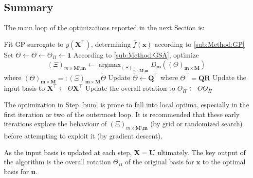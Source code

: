 \documentclass[preprint,12pt]{elsarticle}
\newcommand*{\M}[1]{\ensuremath{#1}\xspace}
\newcommand*{\vr}[1]{\M{\mathbf{#1}}}
\newcommand*{\deqr}{\M{=\mathrel{\mathop:}}}
\DeclareMathOperator*{\argmax}{argmax}
\begin{document}
        \subsection{Summary} \label{sub:Method:Summary}
            The main loop of the optimizations reported in the next Section is:
            \begin{algorithm}
                \begin{algorithmic}[1]
                    \REPEAT
                        \STATE Fit GP surrogate to $y(\vr{X}^{\intercal})$, determining $\bar{f}(\vr{x})$ according to \cref{sub:Method:GP}
                        \STATE Set $\tilde{\Theta} \leftarrow \Theta \leftarrow \Theta_{\Pi} \leftarrow \vr{1}$
                            \STATE According to \cref{sub:Method:GSA}, optimize \label{bum}
                            $$(\Xi)_{m\times\vr{M}\setminus\vr{m}} \leftarrow \argmax_{(\Xi)_{m\times\vr{M}\setminus\vr{m}}} D_{\vr{m}}((\Theta)_{\vr{m}\times\vr{M}})$$
                            where $(\Theta)_{\vr{m}\times\vr{M}} \deqr (\Xi)_{\vr{m}\times\vr{M}} \tilde{\Theta}$
                            \STATE  Update $\tilde{\Theta} \leftarrow \vr{Q}^{\intercal}$ where $\Theta^{\intercal} = \vr{Q}\vr{R}$
                        \ENDFOR
                        \STATE Update the input basis to $\vr{X}^{\intercal} \leftarrow \Theta \vr{X}^{\intercal}$
                        \STATE Update the overall rotation to $\Theta_{\Pi} \leftarrow \Theta \Theta_{\Pi}$
                    \UNTIL{$\Theta \approx \vr{1}$}
                \end{algorithmic}
            \end{algorithm}

            The optimization in Step \ref{bum} is prone to fall into local optima, especially in the first iteration or two of the outermost loop. 
            It is recommended that these early iterations explore the behaviour of \M{(\Xi)_{m\times\vr{M}\setminus\vr{m}}} (by grid or randomized search) before attempting to exploit it (by gradient descent).

            As the input basis is updated at each step, \M{\vr{X} = \vr{U}} ultimately. 
            The key output of the algorithm is the overall rotation \M{\Theta_{\Pi}} of the original basis for \vr{x} to the optimal basis for \vr{u}.
            
\end{document}

